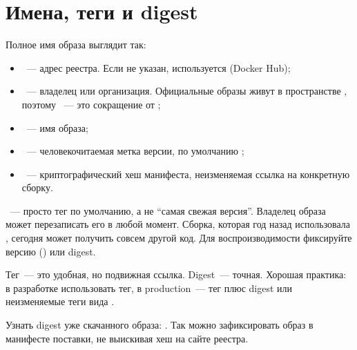 \section{Имена, теги и digest}

Полное имя образа выглядит так:

\begin{center}
\end{center}

\begin{itemize}
  \item {}~--- адрес реестра. Если не указан, используется
         (Docker Hub);
  \item {}~--- владелец или организация. Официальные образы
        живут в пространстве , поэтому ~--- это
        сокращение от ;
  \item {}~--- имя образа;
  \item {}~--- человекочитаемая метка версии, по умолчанию
        ;
  \item {}~--- криптографический хеш манифеста, неизменяемая
        ссылка на конкретную сборку.
\end{itemize}


\begin{warnbox}
~--- просто тег по умолчанию, а не \enquote{самая свежая версия}.
Владелец образа может перезаписать его в любой момент. Сборка, которая
год назад использовала , сегодня может получить совсем
другой код. Для воспроизводимости фиксируйте версию ()
или digest.
\end{warnbox}

Тег~--- это удобная, но подвижная ссылка. Digest~--- точная. Хорошая
практика: в разработке использовать тег, в production~--- тег плюс digest
или неизменяемые теги вида .

\begin{tipbox}
Узнать digest уже скачанного образа:
.
Так можно зафиксировать образ в манифесте поставки, не выискивая хеш
на сайте реестра.
\end{tipbox}

